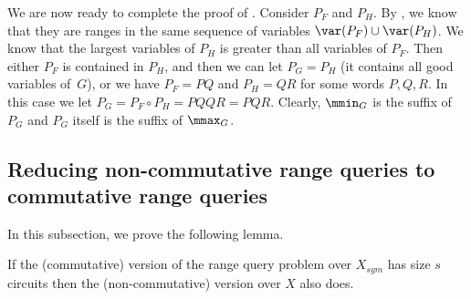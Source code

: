 We are now ready to complete the proof of .
Consider $P_F$ and $P_H$. By  , we know that they are ranges in the same sequence of variables $\var(P_F)\cup \var(P_H)$. We know that the largest variables of $P_H$ is greater than all variables of $P_F$. Then either $P_F$ is contained in $P_H$, and then we can let $P_G=P_H$ (it contains all good variables of~$G$), or we have $P_F =PQ$ and $P_H=QR$ for some words $P, Q, R$. In this case we let $P_G = P_F \circ P_H = PQQR=PQR$. Clearly, $\mmin_G$ is the suffix of $P_G$ and $P_G$ itself is the suffix of $\mmax_G$.
%



\subsection{Reducing non-commutative range queries to commutative range queries} \label{sec:non-commutative_to_commutative}
%

In this subsection, we prove the following lemma.

\begin{lemma} \label{lem:intervals}
    If the (commutative) version of the
    range query
    problem over $X_{sym}$ has
    size $s$ circuits then the (non-commutative) version over $X$ also does.
\end{lemma}

